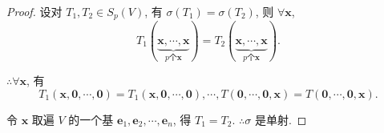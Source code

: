 \documentclass{ctexart}
\begin{document}
\begin{proof}
    设对 $T_1,T_2\in S_p(V)$, 有 $\sigma(T_1)=\sigma(T_2)$, 则 $\forall\boldsymbol{x}$,
    \[T_1(\underbrace{\boldsymbol{x},\cdots,\boldsymbol{x}}_{p\text{个}\boldsymbol{x}})=T_2(\underbrace{\boldsymbol{x},\cdots,\boldsymbol{x}}_{p\text{个}\boldsymbol{x}}).\]

    $\therefore\forall\boldsymbol{x}$, 有
    \[T_1(\boldsymbol{x},\boldsymbol{0},\cdots,\boldsymbol{0})=T_1(\boldsymbol{x},\boldsymbol{0},\cdots,\boldsymbol{0}),\cdots,T(\boldsymbol{0},\cdots,\boldsymbol{0},\boldsymbol{x})=T(\boldsymbol{0},\cdots,\boldsymbol{0},\boldsymbol{x}).\]
    
    令 $\boldsymbol{x}$ 取遍 $V$ 的一个基 $\boldsymbol{e}_1,\boldsymbol{e}_2,\cdots,\boldsymbol{e}_n$, 得 $T_1=T_2$. $\therefore\sigma$ 是单射.
\end{proof}
\end{document}
